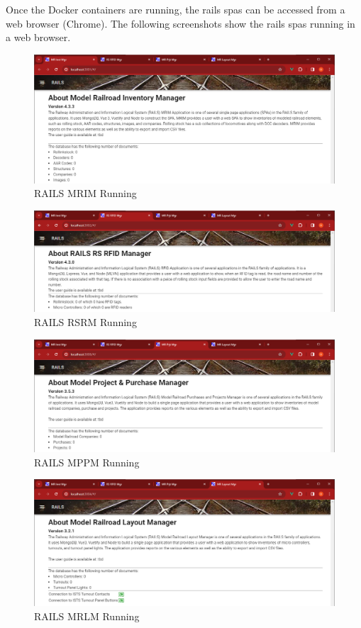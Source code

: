 Once the Docker containers are running, the \gls{rails} \glspl{spa} can be accessed from a web browser (Chrome). The following screenshots show the \gls{rails} \glspl{spa} running in a web browser.
\begin{figure}[H]
    \centering
    \includegraphics[scale=0.46]{mrim.png}
    \caption{RAILS MRIM Running}
    \label{fig:rails-mrim}
\end{figure}
\begin{figure}[H]
    \centering
    \includegraphics[scale=0.46]{rsrm.png}
    \caption{RAILS RSRM Running}
    \label{fig:rails-rsrm}
\end{figure}
\begin{figure}[H]
    \centering
    \includegraphics[scale=0.46]{mppm.png}
    \caption{RAILS MPPM Running}
    \label{fig:rails-mrim}
\end{figure}
\begin{figure}[H]
    \centering
    \includegraphics[scale=0.46]{mrlm.png}
    \caption{RAILS MRLM Running}
    \label{fig:rails-rsrm}
\end{figure}
